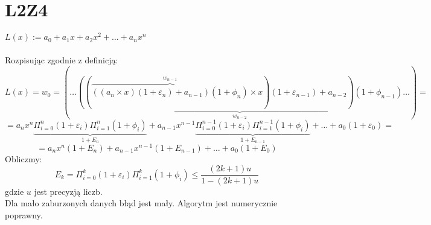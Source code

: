 \documentclass{article}
\title{}
\date{21.10.2020}
\author{Maurycy Borkowski}
\begin{document}
\maketitle

\section{L2Z4}
$L(x) := a_0 +a_1x +a_2x^2 + \dots + a_nx^n$\\\\
Rozpisując zgodnie z definicją:
$$
L(x) = w_0 = (\dots  \underbrace{((\overbrace{((a_n \times x)(1 + \varepsilon_n) + a_{n-1})(1+\phi_n)}^{w_{n-1}} \times x)(1 + \varepsilon_{n-1}) + a_{n-2})(1+\phi_{n-1})}_{w_{n-2}}\dots) =
$$
$$
= a_nx^n\underbrace{\Pi_{i=0}^{n}(1+\varepsilon_{i})\Pi_{i=1}^{n}(1+\phi_{i})}_{1+E_n} + a_{n-1}x^{n-1}\underbrace{\Pi_{i=0}^{{n-1}}(1+\varepsilon_{i})\Pi_{i=1}^{n-1}(1+\phi_{i})}_{1+E_{n-1}} + \dots + a_0(1+\varepsilon_0) =$$
$$
= a_nx^n(1+E_n) + a_{n-1}x^{n-1}(1+E_{n-1}) + \dots + a_0(1+E_0)
$$ 
Obliczmy:
$$
E_k = \Pi_{i=0}^{k}(1+\varepsilon_{i})\Pi_{i=1}^{k}(1+\phi_{i}) \leq \frac{(2k + 1)u}{1-(2k+1)u}
$$
gdzie $u$ jest precyzją liczb.\\
Dla mało zaburzonych danych błąd jest mały. Algorytm jest numerycznie poprawny.
\end{document}
